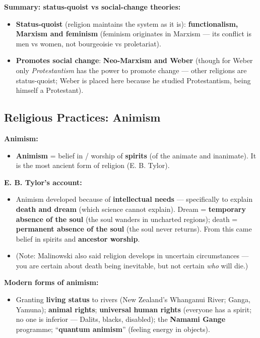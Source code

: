 \begin{DataFact}
\textbf{Summary: status-quoist vs social-change theories:}
\begin{itemize}
\item \textbf{Status-quoist} (religion maintains the system as it is): \textbf{functionalism, Marxism and feminism} (feminism originates in Marxism --- its conflict is men vs women, not bourgeoisie vs proletariat).
\item \textbf{Promotes social change}: \textbf{Neo-Marxism and Weber} (though for Weber only \textit{Protestantism} has the power to promote change --- other religions are status-quoist; Weber is placed here because he studied Protestantism, being himself a Protestant).
\end{itemize}
\end{DataFact}

\sectiondivider

\subsection{Religious Practices: Animism}

\begin{KeyConcept}
\textbf{Animism:}
\begin{itemize}
\item \textbf{Animism} = belief in / worship of \textbf{spirits} (of the animate and inanimate). It is the most ancient form of religion (E. B. Tylor).
\end{itemize}
\end{KeyConcept}

\begin{KeyConcept}
\textbf{E. B. Tylor's account:}
\begin{itemize}
\item Animism developed because of \textbf{intellectual needs} --- specifically to explain \textbf{death and dream} (which science cannot explain). Dream = \textbf{temporary absence of the soul} (the soul wanders in uncharted regions); death = \textbf{permanent absence of the soul} (the soul never returns). From this came belief in spirits and \textbf{ancestor worship}.
\item (Note: Malinowski also said religion develops in uncertain circumstances --- you are certain about death being inevitable, but not certain \textit{who} will die.)
\end{itemize}
\end{KeyConcept}

\begin{ExampleBox}
\textbf{Modern forms of animism:}
\begin{itemize}
\item Granting \textbf{living status} to rivers (New Zealand's Whanganui River; Ganga, Yamuna); \textbf{animal rights}; \textbf{universal human rights} (everyone has a spirit; no one is inferior --- Dalits, blacks, disabled); the \textbf{Namami Gange} programme; ``\textbf{quantum animism}'' (feeling energy in objects).
\end{itemize}
\end{ExampleBox}

